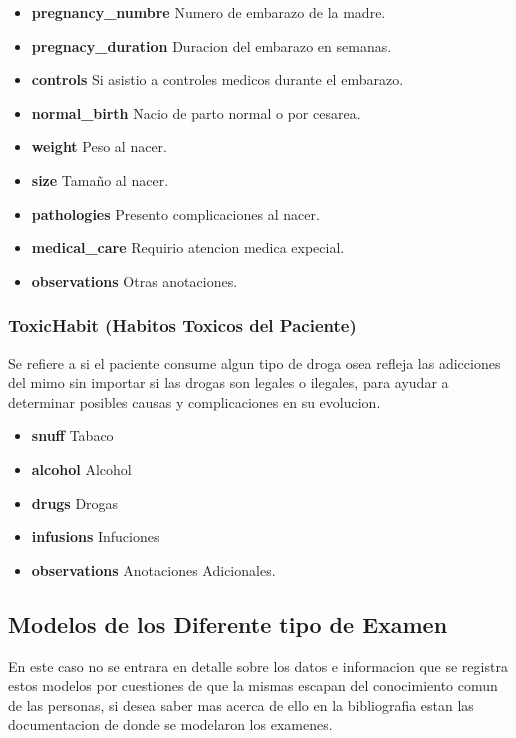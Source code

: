 \begin{itemize}
    \item \textbf{pregnancy\_numbre} Numero de embarazo de la madre.
    \item \textbf{pregnacy\_duration} Duracion del embarazo en semanas.
    \item \textbf{controls} Si asistio a controles medicos durante el embarazo.
    \item \textbf{normal\_birth} Nacio de parto normal o por cesarea.
    \item \textbf{weight} Peso al nacer.
    \item \textbf{size} Tama\~no al nacer.
    \item \textbf{pathologies} Presento complicaciones al nacer.
    \item \textbf{medical\_care} Requirio atencion medica expecial.
    \item \textbf{observations} Otras anotaciones.
\end{itemize}

\subsubsection{ToxicHabit (Habitos Toxicos del Paciente)}
Se refiere a si el paciente consume algun tipo de droga osea refleja las
adicciones del mimo sin importar si las drogas son legales o
ilegales, para ayudar a determinar posibles causas y complicaciones en su
evolucion.

\begin{itemize}
    \item \textbf{snuff} Tabaco
    \item \textbf{alcohol} Alcohol
    \item \textbf{drugs} Drogas
    \item \textbf{infusions} Infuciones
    \item \textbf{observations} Anotaciones Adicionales. 
\end{itemize}


\subsection{Modelos de los Diferente tipo de Examen}

En este caso no se entrara en detalle sobre los datos e informacion que se
registra estos modelos por cuestiones de que la mismas escapan del conocimiento
comun de las personas, si desea saber mas acerca de ello en la bibliografia estan
las documentacion de donde se modelaron los examenes.

